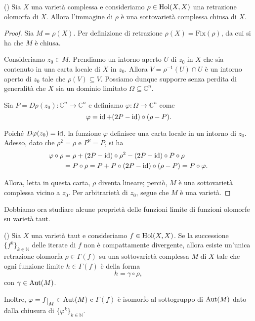 \begin{lm}
    (\cite[Section 5]{Rossi}) Sia $X$ una varietà complessa e consideriamo $\rho\in\textnormal{Hol}(X,X)$ una retrazione olomorfa di $X$. Allora l'immagine di $\rho$ è una sottovarietà complessa chiusa di $X$.
\end{lm}
\begin{proof}
    Sia $M=\rho(X)$. Per definizione di retrazione $\rho(X)=\text{Fix}(\rho)$, da cui si ha che $M$ è chiusa.
    
    Consideriamo $z_0 \in M$. Prendiamo un intorno aperto $U$ di $z_0$ in $X$ che sia contenuto in una carta locale di $X$ in $z_0$. Allora $V=\rho^{-1}(U)\cap U$ è un intorno aperto di $z_0$ tale che $\rho(V) \subseteq V$. Possiamo dunque supporre senza perdita di generalità che $X$ sia un dominio limitato $\Omega\subseteq\mathbb{C}^n$.

    Sia $P=D\rho(z_0):\mathbb{C}^n \longrightarrow \mathbb{C}^n$ e definiamo $\varphi:\Omega \longrightarrow \mathbb{C}^n$ come
    $$\varphi=\operatorname{id}+(2P-\operatorname{id})\circ(\rho-P).$$

    Poiché $D\varphi(z_0)=\operatorname{id}$, la funzione $\varphi$ definisce una carta locale in un intorno di $z_0$. Adesso, dato che $\rho^2=\rho$ e $P^2=P$, si ha
    \begin{align*}
        \varphi\circ\rho&=\rho+(2P-\operatorname{id})\circ\rho^2-(2P-\operatorname{id})\circ P\circ\rho\\
        &=P\circ\rho=P+P\circ(2P-\operatorname{id})\circ(\rho-P)=P\circ\varphi.
    \end{align*}

    Allora, letta in questa carta, $\rho$ diventa lineare; perciò, $M$ è una sottovarietà complessa vicino a $z_0$. Per arbitrarietà di $z_0$, segue che $M$ è una varietà.
\end{proof}

Dobbiamo ora studiare alcune proprietà delle funzioni limite di funzioni olomorfe su varietà taut.

\begin{thm} \label{retraiii}
    (\cite{A3}) Sia $X$ una varietà taut e consideriamo $f\in\textnormal{Hol}(X,X)$. Se la successione $\{f^k\}_{k\in\mathbb{N}}$ delle iterate di $f$ non è compattamente divergente, allora esiste un'unica retrazione olomorfa $\rho\in\Gamma(f)$ su una sottovarietà complessa $M$ di $X$ tale che ogni funzione limite $h\in\Gamma(f)$ è della forma
    $$h=\gamma\circ\rho,$$
    con $\gamma\in\textnormal{Aut}(M)$.

    Inoltre, $\varphi=f\restrict{M}\in\textnormal{Aut}(M)$ e $\Gamma(f)$ è isomorfo al sottogruppo di $\textnormal{Aut}(M)$ dato dalla chiusura di $\{\varphi^k\}_{k \in\mathbb{N}}$.
\end{thm}

